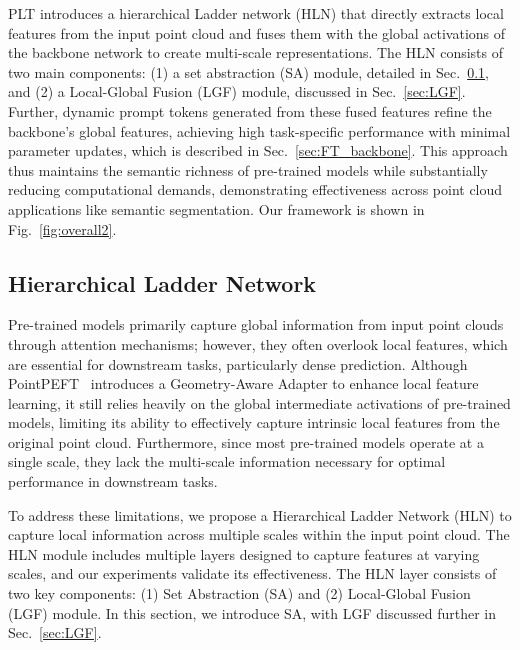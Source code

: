 PLT introduces a hierarchical Ladder network (HLN) that directly extracts local features from the input point cloud and fuses them with the global activations of the backbone network to create multi-scale representations. The HLN consists of two main components: (1) a set abstraction (SA) module, detailed in Sec.~\ref{sec:HLN}, and (2) a Local-Global Fusion (LGF) module, discussed in Sec.~\ref{sec:LGF}. Further, dynamic prompt tokens generated from these fused features refine the backbone’s global features, achieving high task-specific performance with minimal parameter updates, which is described in Sec.~\ref{sec:FT_backbone}. This approach thus maintains the semantic richness of pre-trained models while substantially reducing computational demands, demonstrating effectiveness across point cloud applications like semantic segmentation.
Our framework is shown in Fig.~\ref{fig:overall2}.

\subsection{Hierarchical Ladder Network}
\label{sec:HLN}
Pre-trained models primarily capture global information from input point clouds through attention mechanisms; however, they often overlook local features, which are essential for downstream tasks, particularly dense prediction. Although PointPEFT~\cite{tang2024point} introduces a Geometry-Aware Adapter to enhance local feature learning, it still relies heavily on the global intermediate activations of pre-trained models, limiting its ability to effectively capture intrinsic local features from the original point cloud. Furthermore, since most pre-trained models operate at a single scale, they lack the multi-scale information necessary for optimal performance in downstream tasks.

To address these limitations, we propose a Hierarchical Ladder Network (HLN) to capture local information across multiple scales within the input point cloud. The HLN module includes multiple layers designed to capture features at varying scales, and our experiments validate its effectiveness. The HLN layer consists of two key components: (1) Set Abstraction (SA) and (2) Local-Global Fusion (LGF) module. 
In this section, we introduce SA, with LGF discussed further in Sec.~\ref{sec:LGF}.

